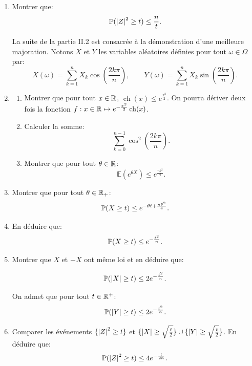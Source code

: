 \begin{enumerate}



\item Montrer que:
\[ \mathbb{P}(\left\vert Z\right\vert^{2} \geq t) \leq \frac{n}{t}.\]

La suite de la partie II.2 est consacrée à la démonstration d'une meilleure majoration. Notons $X$ et $Y$ les variables aléatoires définies pour tout $\omega \in \Omega$ par:
\[ X(\omega) = \sum_{k=1}^{n}X_{k}\cos \left ( \frac{2k\pi}{n}\right ),\qquad Y(\omega) = \sum_{k=1}^{n}X_{k}\sin \left ( \frac{2k\pi}{n}\right ).\]

\item \begin{enumerate}
           \item Montrer que pour tout $x\in \mathbb{R}$, $\operatorname{ch}(x) \leq e^{\frac{x^{2}}{2}}$. 
           On pourra dériver deux fois la fonction $f:x\in \mathbb{R} \mapsto e^{-\frac{x^{2}}{2}}\operatorname{ch}(x)$.
           \item Calculer la somme:
           \[ \sum_{k=0}^{n-1}\cos^{2}\left ( \frac{2k\pi}{n}\right ).\]
           \item Montrer que pour tout $\theta \in \mathbb{R}$:
           \[ \mathbb{E}(e^{\theta X})\leq e^{\frac{n\theta^{2}}{4}}.\]
           
          \end{enumerate}
          
\item Montrer que pour tout $\theta \in \mathbb{R}_{+}$:
\[ \mathbb{P} (X \geq t) \leq e^{-\theta t + \frac{n\theta^{2}}{4}}.\]

\item En déduire que:
\[ \mathbb{P}(X \geq t) \leq e^{-\frac{t^{2}}{n}}.\]

\item Montrer que $X$ et $-X$ ont même loi et en déduire que:

\[ \mathbb{P}(\left\vert X\right\vert\geq t) \leq 2e^{-\frac{t^{2}}{n}}.\]

On admet que pour tout $t\in \mathbb{R}^{+}$:
\[ \mathbb{P}(\left\vert Y\right\vert\geq t) \leq 2e^{-\frac{t^{2}}{n}}.\]

\item Comparer les événements $\{ \left\vert Z\right\vert^{2}\geq t \}$ et $\{ \left\vert X\right\vert \geq \sqrt{\frac{t}{2}}\} \cup \{ \left\vert Y\right\vert \geq \sqrt{\frac{t}{2}} \}$. En déduire que:
\[ \mathbb{P}(\left\vert Z\right\vert^{2}\geq t) \leq 4e^{-\frac{t}{2n}}.\]

 
 

\end{enumerate}

